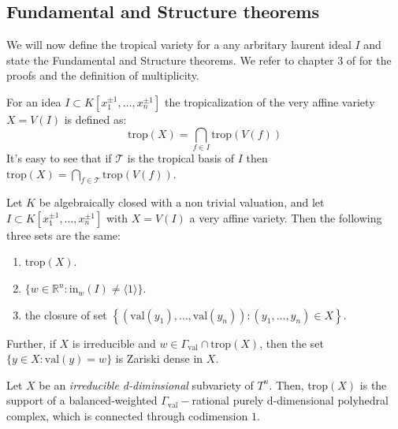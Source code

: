     \subsection{Fundamental and Structure theorems}
    We will now define the tropical variety for a any arbritary laurent ideal $I$ and state the Fundamental and Structure theorems. 
    We refer to chapter 3 of \cite{maclagan2015introduction} for the proofs and the definition of multiplicity.
    \par For an idea $I \subset K[x_1^{\pm 1}, \dots, x_n^{\pm 1}]$ the tropicalization of the very affine variety $X = V(I)$ is defined as:
    \[
        \text{trop}(X) = \bigcap_{f \in I}\text{trop}(V(f))
    \]
    It's easy to see that if $\mathcal{T}$ is the tropical basis of $I$ then $\text{trop}(X) = \bigcap_{f \in \mathcal{T}}\text{trop}(V(f))$.
    \begin{theorem}
        Let $K$ be algebraically closed with a non trivial valuation, and let $I \subset K[x_1^{\pm 1}, \dots, x_n^{\pm 1}]$ with $X = V(I)$ a very affine variety. 
        Then the following three sets are the same:
        \begin{enumerate}
            \item $\text{trop}(X)$.
            \item $\{w \in \mathbb{R}^{n}: \text{in}_{w}(I) \neq \langle 1\rangle\}$. 
            \item the closure of set $\left\{(\text{val}(y_1), \dots, \text{val}(y_n)): (y_1,\dots, y_n) \in X\right\}$.
        \end{enumerate}
        Further, if $X$ is irreducible and $w \in \Gamma_{\text{val}} \cap \text{trop}(X)$, then the set $\{y \in X: \text{val}(y) = w\}$ is Zariski dense in $X$.
    \end{theorem}
    \begin{theorem}
        Let $X$ be an \textit{irreducible d-diminsional} subvariety of $T^{n}$. Then, trop$(X)$ is the support of a balanced-weighted $\Gamma_{\text{val}}-$rational purely d-dimensional polyhedral complex, which is connected through codimension $1$.
    \end{theorem}

